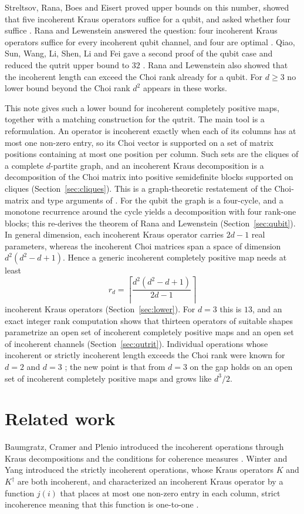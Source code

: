 \documentclass[11pt,a4paper]{article}
\theoremstyle{definition}
\theoremstyle{plain}
\begin{document}
Streltsov, Rana, Boes and Eisert proved upper bounds on this number, showed
that five incoherent Kraus operators suffice for a qubit, and asked whether
four suffice \cite{Streltsov2017PRL}. Rana and Lewenstein answered the
question: four incoherent Kraus operators suffice for every incoherent qubit
channel, and four are optimal \cite{RanaLewenstein2018}. Qiao, Sun, Wang, Li,
Shen, Li and Fei gave a second proof of the qubit case and reduced the qutrit
upper bound to $32$ \cite{Qiao2020}. Rana and Lewenstein also showed that the
incoherent length can exceed the Choi rank already for a qubit. For $d\ge3$
no lower bound beyond the Choi rank $d^2$ appears in these works.

This note gives such a lower bound for incoherent completely positive maps,
together with a matching construction for the qutrit. The main tool is a
reformulation. An operator is incoherent exactly when each of its columns has
at most one non-zero entry, so its Choi vector is supported on a set of
matrix positions containing at most one position per column. Such sets are
the cliques of a complete $d$-partite graph, and an incoherent Kraus
decomposition is a decomposition of the Choi matrix into positive
semidefinite blocks supported on cliques (Section~\ref{sec:cliques}). This is
a graph-theoretic restatement of the Choi-matrix and type arguments of
\cite{Streltsov2017PRL,RanaLewenstein2018}. For the
qubit the graph is a four-cycle, and a monotone recurrence around the cycle
yields a decomposition with four rank-one blocks; this re-derives the theorem
of Rana and Lewenstein (Section~\ref{sec:qubit}). In general
dimension, each incoherent Kraus operator carries $2d-1$ real parameters,
whereas the incoherent Choi matrices span a space of dimension
$d^2(d^2-d+1)$. Hence a generic incoherent completely positive map needs at
least
\[
r_d=\left\lceil\frac{d^2(d^2-d+1)}{2d-1}\right\rceil
\]
incoherent Kraus operators (Section~\ref{sec:lower}). For $d=3$ this is
$13$, and an exact integer rank computation shows that thirteen operators of
suitable shapes parametrize an open set of incoherent completely positive
maps and an open set of incoherent channels (Section~\ref{sec:qutrit}).
Individual operations whose incoherent or strictly incoherent length exceeds
the Choi rank were known for $d=2$ and $d=3$ \cite{RanaLewenstein2018}; the
new point is that from $d=3$ on the gap holds on an open set of incoherent
completely positive maps and grows like $d^3/2$.

\section{Related work}\label{sec:related}
Baumgratz, Cramer and Plenio introduced the incoherent operations through
Kraus decompositions and the conditions for coherence measures
\cite{Baumgratz2014}.
Winter and Yang introduced the strictly incoherent operations, whose Kraus
operators $K$ and $K^\dagger$ are both incoherent, and characterized an
incoherent Kraus operator by a function $j(i)$ that places at most one
non-zero entry in each column, strict incoherence meaning that this function is
one-to-one \cite{WinterYang2016}.
\end{document}
